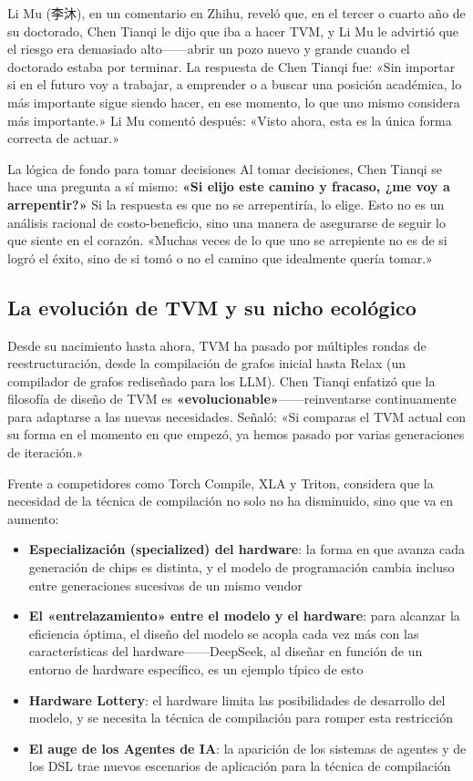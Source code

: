 \documentclass[a4paper]{article}
\begin{document}
Li Mu (李沐), en un comentario en Zhihu, reveló que, en el tercer o cuarto año de su doctorado, Chen Tianqi le dijo que iba a hacer TVM, y Li Mu le advirtió que el riesgo era demasiado alto------abrir un pozo nuevo y grande cuando el doctorado estaba por terminar. La respuesta de Chen Tianqi fue: «Sin importar si en el futuro voy a trabajar, a emprender o a buscar una posición académica, lo más importante sigue siendo hacer, en ese momento, lo que uno mismo considera más importante.» Li Mu comentó después: «Visto ahora, esta es la única forma correcta de actuar.»

\begin{importantbox}{La lógica de fondo para tomar decisiones}
Al tomar decisiones, Chen Tianqi se hace una pregunta a sí mismo: \textbf{«Si elijo este camino y fracaso, ¿me voy a arrepentir?»} Si la respuesta es que no se arrepentiría, lo elige. Esto no es un análisis racional de costo-beneficio, sino una manera de asegurarse de seguir lo que siente en el corazón. «Muchas veces de lo que uno se arrepiente no es de si logró el éxito, sino de si tomó o no el camino que idealmente quería tomar.»
\end{importantbox}

\subsection{La evolución de TVM y su nicho ecológico}

Desde su nacimiento hasta ahora, TVM ha pasado por múltiples rondas de reestructuración, desde la compilación de grafos inicial hasta Relax (un compilador de grafos rediseñado para los LLM). Chen Tianqi enfatizó que la filosofía de diseño de TVM es \textbf{«evolucionable»}------reinventarse continuamente para adaptarse a las nuevas necesidades. Señaló: «Si comparas el TVM actual con su forma en el momento en que empezó, ya hemos pasado por varias generaciones de iteración.»

Frente a competidores como Torch Compile, XLA y Triton, considera que la necesidad de la técnica de compilación no solo no ha disminuido, sino que va en aumento:

\begin{itemize}
    \item \textbf{Especialización (specialized) del hardware}: la forma en que avanza cada generación de chips es distinta, y el modelo de programación cambia incluso entre generaciones sucesivas de un mismo vendor
    \item \textbf{El «entrelazamiento» entre el modelo y el hardware}: para alcanzar la eficiencia óptima, el diseño del modelo se acopla cada vez más con las características del hardware------DeepSeek, al diseñar en función de un entorno de hardware específico, es un ejemplo típico de esto
    \item \textbf{Hardware Lottery}: el hardware limita las posibilidades de desarrollo del modelo, y se necesita la técnica de compilación para romper esta restricción
    \item \textbf{El auge de los Agentes de IA}: la aparición de los sistemas de agentes y de los DSL trae nuevos escenarios de aplicación para la técnica de compilación
\end{itemize}
\end{document}
